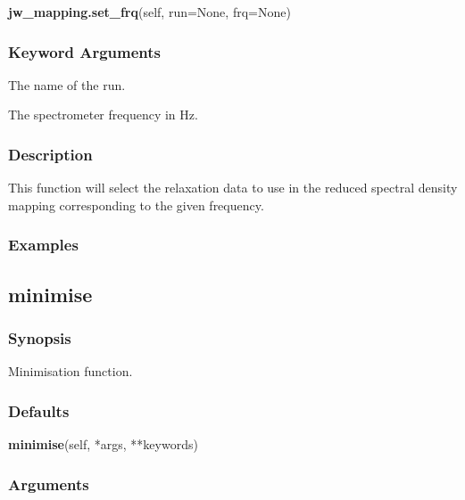  \textsf{\textbf{jw\_mapping.set\_frq}(self, run=None, frq=None)} 

  
 \subsubsection{Keyword Arguments} 

   The name of the run.   

   The spectrometer frequency in Hz.  

  

  
 \subsubsection{Description} 

 This function will select the relaxation data to use in the reduced spectral density mapping corresponding to the given frequency. 
  

  
 \subsubsection{Examples} 



  

 \newpage 

 \subsection{minimise} 

  
 \subsubsection{Synopsis} 

 Minimisation function. 
  

  
 \subsubsection{Defaults} 

 \textsf{\textbf{minimise}(self, *args, **keywords)} 

  
 \subsubsection{Arguments} 

